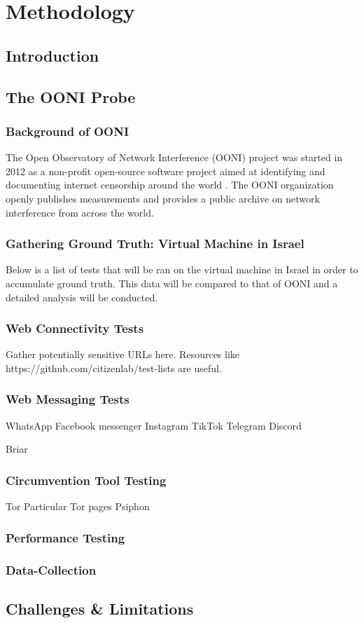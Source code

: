 \chapter{Methodology}
\section{Introduction}

\section{The OONI Probe}

\subsection{Background of OONI}

The Open Observatory of Network Interference (OONI) project was started in 2012 as a non-profit open-source software project aimed at identifying and documenting internet censorship around the world \cite{ooniAbout}. The OONI organization openly publishes measurements and provides a public archive on network interference from across the world. 

\subsection{Gathering Ground Truth: Virtual Machine in Israel}
Below is a list of tests that will be ran on the virtual machine in Israel in order to accumulate ground truth. This data will be compared to that of OONI and a detailed analysis will be conducted.

\subsection{Web Connectivity Tests}
Gather potentially sensitive URLs here. Resources like https://github.com/citizenlab/test-lists are useful.

\subsection{Web Messaging Tests}
WhatsApp
Facebook messenger
Instagram
TikTok
Telegram
Discord

Briar

\subsection{Circumvention Tool Testing}
Tor
Particular Tor pages
Psiphon

\subsection{Performance Testing}

\subsection{Data-Collection}

\section{Challenges \& Limitations}
